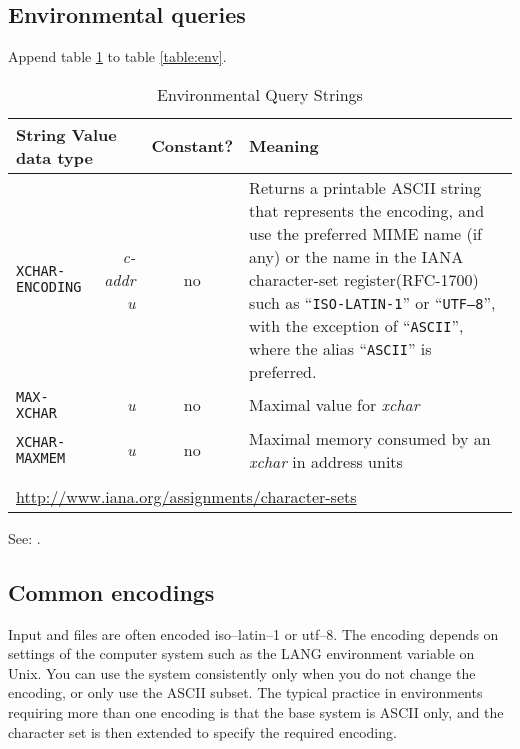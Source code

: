 \subsection{Environmental queries} %

Append table \ref{xchar:env} to table \ref{table:env}.

\begin{table}[ht]
	\begin{center}
		\caption{Environmental Query Strings}
		\label{xchar:env}
		\begin{tabular}{p{9em}rcp{}}
			\hline\hline
			\multicolumn{2}{l}{String \hfill Value data type} & Constant? & Meaning \\
			\hline
			\texttt{XCHAR-ENCODING}		& \emph{c-addr u} & no &
				Returns a printable ASCII string that represents the encoding,
				and use the preferred MIME name (if any) or the name in the
				IANA character-set register\footnotemark[1] (RFC-1700) such
				as ``\texttt{ISO-LATIN-1}'' or ``\texttt{UTF--8}'',
				with the exception of ``\texttt{ASCII}'', where the alias
				``\texttt{ASCII}'' is preferred. \\
			\texttt{MAX-XCHAR}			& \emph{u} & no &
				Maximal value for \emph{xchar} \\
			\texttt{XCHAR-MAXMEM}		& \emph{u} & no &
				Maximal memory consumed by an \emph{xchar} in address units \\
			\hline\hline \\[-1ex]
			\multicolumn{4}{l}{\footnotemark[1]
				\url{http://www.iana.org/assignments/character-sets}} \\
		\end{tabular}
	\end{center}
\end{table}

See: .

\subsection{Common encodings} %

Input and files are often encoded iso--latin--1 or utf--8.  The encoding
depends on settings of the computer system such as the LANG environment
variable on Unix.  You can use the system consistently only when you do
not change the encoding, or only use the ASCII subset.
The typical practice in environments requiring more than one encoding
is that the base system is ASCII only, and the character set is then
extended to specify the required encoding.


